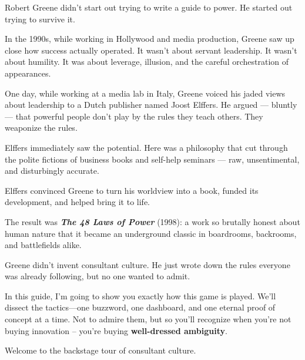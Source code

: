 \begin{tcolorbox}[title=Historical Sidebar: How Cynicism Became a Business Model, colback=gray!5!white, colframe=black!80!white, fonttitle=\bfseries]

  Robert Greene didn’t start out trying to write a guide to power.  He started out trying to survive it.

  \medskip
  
  In the 1990s, while working in Hollywood and media production, Greene saw up close how success actually operated.  It wasn’t about servant leadership. It wasn’t about humility.  It was about leverage, illusion, and the careful orchestration of appearances.

  \medskip
  
  One day, while working at a media lab in Italy, Greene voiced his jaded views about leadership to a Dutch publisher named Joost Elffers.  He argued — bluntly — that powerful people don't play by the rules they teach others.  They weaponize the rules.

  \medskip
  
  Elffers immediately saw the potential.  Here was a philosophy that cut through the polite fictions of business books and self-help seminars — raw, unsentimental, and disturbingly accurate.

  \medskip
  
  Elffers convinced Greene to turn his worldview into a book, funded its development, and helped bring it to life.

  \medskip
  
  The result was \textbf{\textit{The 48 Laws of Power}} (1998): a work so brutally honest about human nature that it became an underground classic in boardrooms, backrooms, and battlefields alike.

  \medskip
  
  Greene didn’t invent consultant culture.  He just wrote down the rules everyone was already following, but no one wanted to admit.
  
\end{tcolorbox}


In this guide, I’m going to show you exactly how this game is played. We’ll dissect the tactics—one buzzword, one dashboard, and one eternal proof of concept at a time. Not to admire them, but so you’ll recognize when you're not buying innovation -- you’re buying \textbf{well-dressed ambiguity}.

Welcome to the backstage tour of consultant culture.


